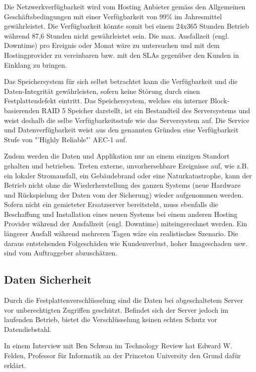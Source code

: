 Die Netzwerkverfügbarkeit wird vom Hosting Anbieter gemäss den Allgemeinen Geschäftsbedingungen \cite{Ag2009} mit einer Verfügbarkeit von 99\% im Jahresmittel gewährleistet. Die Verfügbarkeit könnte somit bei einem 24x365 Stunden Betrieb während 87,6 Stunden nicht gewährleistet sein. Die max. Ausfallzeit (engl. Downtime) pro Ereignis oder Monat wäre zu untersuchen und mit dem Hostingprovider zu vereinbaren bzw. mit den SLAs gegenüber den Kunden in Einklang zu bringen.

Das Speichersystem für sich selbst betrachtet kann die Verfügbarkeit und die Daten-Integrität gewährleisten, sofern keine Störung durch einen Festplattendefekt eintritt. Das Speichersystem, welches ein interner Block-basierenden RAID 5 Speicher darstellt, ist ein Bestandteil des Serversystems und weist deshalb die selbe Verfügbarkeitsstufe wie das Serversystem auf. Die Service und Datenverfügbarkeit weist aus den genannten Gründen eine Verfügbarkeit Stufe von "'Highly Reliable"' AEC-1 auf.

Zudem werden die Daten und Applikation nur an einem einzigen Standort gehalten und betrieben. Treten externe, unvorhersehbare Ereignisse auf, wie z.B. ein lokaler Stromausfall, ein Gebäudebrand oder eine Naturkatastrophe, kann der Betrieb nicht ohne die Wiederherstellung des ganzen Systems (neue Hardware und Rückspielung der Daten vom der Sicherung) wieder aufgenommen werden. Sofern nicht ein gemieteter Ersatzserver bereitsteht, muss ebenfalls die Beschaffung und Installation eines neuen Systems bei einem anderen Hosting Provider während der Ausfallzeit (engl. Downtime) miteingerechnet werden. Ein längerer Ausfall während mehreren Tagen wäre ein realistisches Szenario. Die daraus entstehenden Folgeschäden  wie Kundenverlust, hoher Imageschaden usw. sind vom Auftraggeber abzuschätzen.

\subsection{Daten Sicherheit}
Durch die Festplattenverschlüsselung sind die Daten bei abgeschaltetem Server vor unberechtigten Zugriffen geschützt. Befindet sich der Server jedoch im laufenden Betrieb, bietet die Verschlüsselung keinen echten Schutz vor Datendiebstahl. 

In einem Interview mit Ben Schwan im Technology Review hat Edward W. Felden, Professor für Informatik an der Princeton University den Grund dafür erklärt. 

